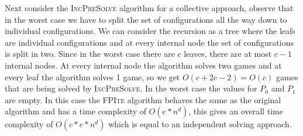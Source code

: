 Next consider the \textsc{IncPreSolve} algorithm for a collective approach, observe that in the worst case we have to split the set of configurations all the way down to individual configurations. We can consider the recursion as a tree where the leafs are individual configurations and at every internal node the set of configurations is split in two. Since in the worst case there are $c$ leaves, there are at most $c-1$ internal nodes. At every internal node the algorithm solves two games and at every leaf the algorithm solves 1 game, so we get $O(c + 2c - 2) = O(c)$ games that are being solved by \textsc{IncPreSolve}. In the worst case the values for $P_0$ and $P_1$ are empty. In this case the \textsc{FPIte} algorithm behaves the same as the original algorithm and has a time complexity of $O(e*n^d)$, this gives an overall time complexity of $O(c*e*n^d)$ which is equal to an independent solving approach.